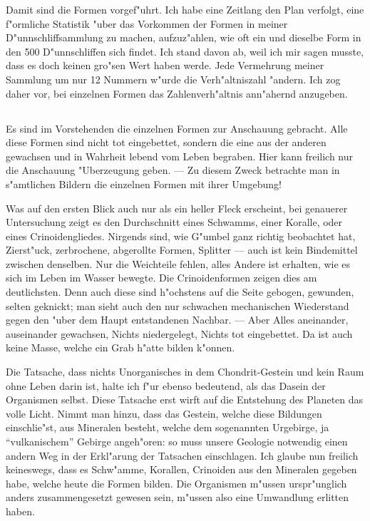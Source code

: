 \documentclass[a4paper, 11pt, oneside]{article}
\begin{document}
Damit sind die Formen vorgef"uhrt. Ich habe eine Zeitlang den Plan verfolgt, eine f"ormliche Statistik "uber das Vorkommen der Formen in meiner D"unnschliffsammlung zu machen, aufzuz"ahlen, wie oft ein und dieselbe Form in den 500 D"unnschliffen sich findet. Ich stand davon ab, weil ich mir sagen musste, dass es doch keinen gro"sen Wert haben werde. Jede Vermehrung meiner Sammlung um nur 12 Nummern w"urde die Verh"altniszahl "andern. Ich zog daher vor, bei einzelnen Formen das Zahlenverh"altnis ann"ahernd anzugeben.
\clearpage
\subsection{}
\paragraph{}
Es sind im Vorstehenden die einzelnen Formen zur Anschauung gebracht. Alle diese Formen sind nicht tot eingebettet, sondern die eine aus der anderen gewachsen und in Wahrheit lebend vom Leben begraben. Hier kann freilich nur die Anschauung "Uberzeugung geben. --- Zu diesem Zweck betrachte man in s"amtlichen Bildern die einzelnen Formen mit ihrer Umgebung!

Was auf den ersten Blick auch nur als ein heller Fleck erscheint, bei genauerer Untersuchung zeigt es den Durchschnitt eines Schwamms, einer Koralle, oder eines Crinoidengliedes. Nirgends sind, wie G"umbel ganz richtig beobachtet hat, Zierst"uck, zerbrochene, abgerollte Formen, Splitter --- auch ist kein Bindemittel zwischen denselben. Nur die Weichteile fehlen, alles Andere ist erhalten, wie es sich im Leben im Wasser bewegte. Die Crinoidenformen zeigen dies am deutlichsten. Denn auch diese sind h"ochstens auf die Seite gebogen, gewunden, selten geknickt; man sieht auch den nur schwachen mechanischen Wiederstand gegen den "uber dem Haupt entstandenen Nachbar. --- Aber Alles aneinander, auseinander gewachsen, Nichts niedergelegt, Nichts tot eingebettet. Da ist auch keine Masse, welche ein Grab h"atte bilden k"onnen.

Die Tatsache, dass nichts Unorganisches in dem Chondrit-Gestein und kein Raum ohne Leben darin ist, halte ich f"ur ebenso bedeutend, als das Dasein der Organismen selbst. Diese Tatsache erst wirft auf die Entstehung des Planeten das volle Licht. Nimmt man hinzu, dass das Gestein, welche diese Bildungen einschlie"st, aus Mineralen besteht, welche dem sogenannten Urgebirge, ja "`vulkanischem"' Gebirge angeh"oren: so muss unsere Geologie notwendig einen andern Weg in der Erkl"arung der Tatsachen einschlagen. Ich glaube nun freilich keineswegs, dass es Schw"amme, Korallen, Crinoiden aus den Mineralen gegeben habe, welche heute die Formen bilden. Die Organismen m"ussen urspr"unglich anders zusammengesetzt gewesen sein, m"ussen also eine Umwandlung erlitten haben.
\end{document}
